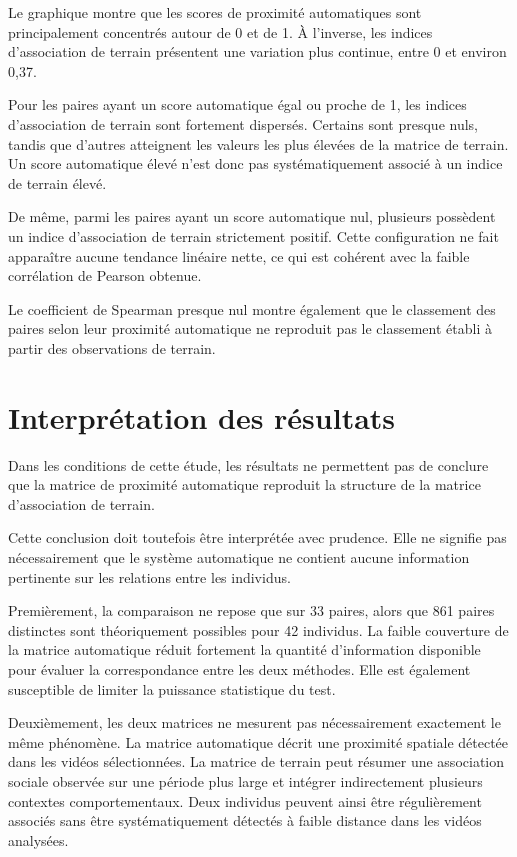 \documentclass[11pt,a4paper]{report}
\begin{document}
Le graphique montre que les scores de proximité automatiques sont
principalement concentrés autour de 0 et de 1. À l'inverse, les indices
d'association de terrain présentent une variation plus continue, entre
0 et environ 0,37.

Pour les paires ayant un score automatique égal ou proche de 1, les
indices d'association de terrain sont fortement dispersés. Certains
sont presque nuls, tandis que d'autres atteignent les valeurs les plus
élevées de la matrice de terrain. Un score automatique élevé n'est donc
pas systématiquement associé à un indice de terrain élevé.

De même, parmi les paires ayant un score automatique nul, plusieurs
possèdent un indice d'association de terrain strictement positif. Cette
configuration ne fait apparaître aucune tendance linéaire nette, ce qui
est cohérent avec la faible corrélation de Pearson obtenue.

Le coefficient de Spearman presque nul montre également que le
classement des paires selon leur proximité automatique ne reproduit pas
le classement établi à partir des observations de terrain.


\section{Interprétation des résultats}
\label{sec:interpretation_mantel}

Dans les conditions de cette étude, les résultats ne permettent pas de
conclure que la matrice de proximité automatique reproduit la structure
de la matrice d'association de terrain.

Cette conclusion doit toutefois être interprétée avec prudence. Elle ne
signifie pas nécessairement que le système automatique ne contient
aucune information pertinente sur les relations entre les individus.

Premièrement, la comparaison ne repose que sur 33 paires, alors que 861
paires distinctes sont théoriquement possibles pour 42 individus. La
faible couverture de la matrice automatique réduit fortement la
quantité d'information disponible pour évaluer la correspondance entre
les deux méthodes. Elle est également susceptible de limiter la
puissance statistique du test.

Deuxièmement, les deux matrices ne mesurent pas nécessairement
exactement le même phénomène. La matrice automatique décrit une
proximité spatiale détectée dans les vidéos sélectionnées. La matrice de
terrain peut résumer une association sociale observée sur une période
plus large et intégrer indirectement plusieurs contextes
comportementaux. Deux individus peuvent ainsi être régulièrement
associés sans être systématiquement détectés à faible distance dans les
vidéos analysées.
\end{document}
